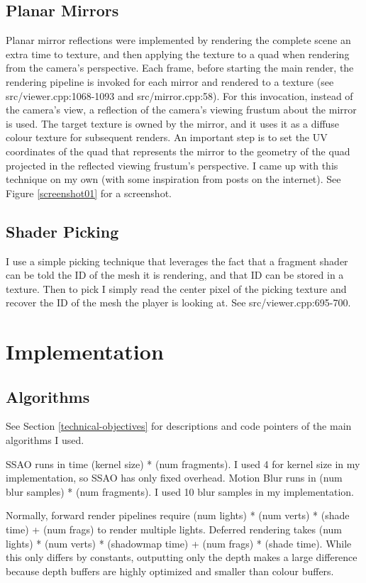 \documentclass{book}
\begin{document}
    \subsection{Planar Mirrors} \label{mirrors}
      Planar mirror reflections were implemented by rendering the complete scene an extra time to texture, and then applying the texture to a quad when rendering from the camera's perspective. Each frame, before starting the main render, the rendering pipeline is invoked for each mirror and rendered to a texture (see src/viewer.cpp:1068-1093 and src/mirror.cpp:58). For this invocation, instead of the camera's view, a reflection of the camera's viewing frustum about the mirror is used. The target texture is owned by the mirror, and it uses it as a diffuse colour texture for subsequent renders. An important step is to set the UV coordinates of the quad that represents the mirror to the geometry of the quad projected in the reflected viewing frustum's perspective. I came up with this technique on my own (with some inspiration from posts on the internet). See Figure \ref{screenshot01} for a screenshot.


    \subsection{Shader Picking} \label{picking}
      I use a simple picking technique that leverages the fact that a fragment shader can be told the ID of the mesh it is rendering, and that ID can be stored in a texture. Then to pick I simply read the center pixel of the picking texture and recover the ID of the mesh the player is looking at. See src/viewer.cpp:695-700.



  \section{Implementation}
    \subsection{Algorithms}
      See Section \ref{technical-objectives} for descriptions and code pointers of the main algorithms I used.

      SSAO runs in time (kernel size) * (num fragments). I used 4 for kernel size in my implementation, so SSAO has only fixed overhead.
      Motion Blur runs in (num blur samples) * (num fragments). I used 10 blur samples in my implementation.

      Normally, forward render pipelines require (num lights) * (num verts) * (shade time) + (num frags) to render multiple lights. Deferred rendering takes (num lights) * (num verts) * (shadowmap time) + (num frags) * (shade time). While this only differs by constants, outputting only the depth makes a large difference because depth buffers are highly optimized and smaller than colour buffers.
\end{document}
